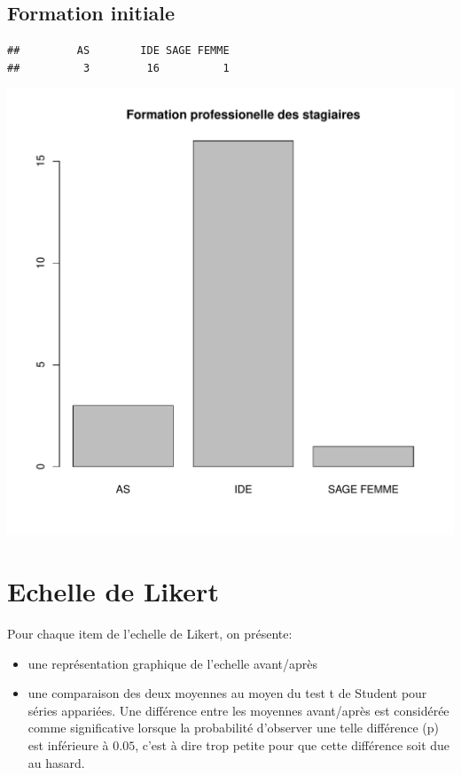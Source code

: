 \documentclass[12pt,english,french]{article}\usepackage{graphicx, color}
\makeatletter
\def\maxwidth{ %
  \ifdim\Gin@nat@width>\linewidth
    \linewidth
  \else
    \Gin@nat@width
  \fi
}
\newenvironment{kframe}{%
 \def\at@end@of@kframe{}%
 \ifinner\ifhmode%
  \def\at@end@of@kframe{\end{minipage}}%
  \begin{minipage}{\columnwidth}%
 \fi\fi%
 \def\FrameCommand##1{\hskip\@totalleftmargin \hskip-\fboxsep
 \colorbox{shadecolor}{##1}\hskip-\fboxsep
     \hskip-\linewidth \hskip-\@totalleftmargin \hskip\columnwidth}%
 \MakeFramed {\advance\hsize-\width
   \@totalleftmargin\z@ \linewidth\hsize
   \@setminipage}}%
 {\par\unskip\endMakeFramed%
 \at@end@of@kframe}
\newenvironment{knitrout}{}{} %
\makeatother
\begin{document}
\subsection{Formation initiale}
\begin{knitrout}
\color{fgcolor}\begin{kframe}
\begin{verbatim}
##         AS        IDE SAGE FEMME 
##          3         16          1
\end{verbatim}
\end{kframe}
\includegraphics[width=\maxwidth]{figure/unnamed-chunk-1} 

\end{knitrout}



\section{Echelle de Likert}

Pour chaque item de l'echelle de Likert, on présente:
\begin{itemize}
  \item une représentation graphique de l'echelle avant/après
  \item une comparaison des deux moyennes au moyen du test t de Student pour séries appariées. Une différence entre les moyennes avant/après est considérée comme significative lorsque la probabilité d'observer une telle différence (p) est inférieure à $0.05$, c'est à dire trop petite pour que cette différence soit due au hasard.
\end{itemize}
\end{document}
